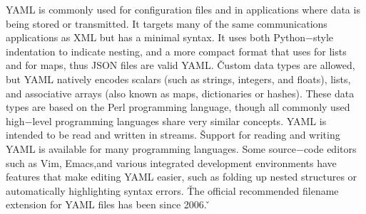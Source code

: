 YAML is commonly used for configuration files and in applications where data is being stored or transmitted. It
targets many of the same communications applications as XML but has a minimal syntax. It uses both Python$-$style
indentation to indicate nesting, and a more compact format that uses \code{$[\ldots]$} for lists and
\code{$\{\ldots\}$} for maps, thus JSON files are valid YAML. \v

Custom data types are allowed, but YAML natively encodes scalars (such as strings, integers, and floats), lists, and
associative arrays (also known as maps, dictionaries or hashes). These data types are based on the Perl programming
language, though all commonly used high$-$level programming languages share very similar concepts. YAML is intended
to be read and written in streams. \v

Support for reading and writing YAML is available for many programming languages. Some source$-$code editors such as
Vim, Emacs,and various integrated development environments have features that make editing YAML easier, such as
folding up nested structures or automatically highlighting syntax errors. \v

The official recommended filename extension for YAML files has been  since 2006. \v

